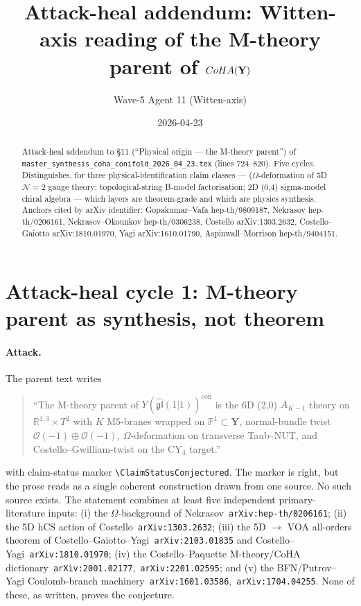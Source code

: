 \documentclass[11pt]{amsart}
\title{Attack-heal addendum: Witten-axis reading of the M-theory parent of
  $\CoHA(\bY)$}
\author{Wave-5 Agent 11 (Witten-axis)}
\date{2026-04-23}
\theoremstyle{definition}
\providecommand{\bY}{\mathbf{Y}}
\providecommand{\cO}{\mathcal{O}}
\providecommand{\bR}{\mathbb{R}}
\providecommand{\bP}{\mathbb{P}}
\providecommand{\fgl}{\mathfrak{gl}}
\providecommand{\cN}{\mathcal{N}}
\begin{document}
\maketitle

\begin{abstract}
\noindent Attack-heal addendum to \S11 (``Physical origin --- the
M-theory parent'') of
\texttt{master\_synthesis\_coha\_conifold\_2026\_04\_23.tex}
(lines 724--820). Five cycles. Distinguishes, for three
physical-identification claim classes --- ($\Omega$-deformation of
5D $\cN=2$ gauge theory; topological-string B-model factorisation;
2D (0,4) sigma-model chiral algebra --- which layers are theorem-grade
and which are physics synthesis. Anchors cited by arXiv identifier:
Gopakumar--Vafa hep-th/9809187, Nekrasov hep-th/0206161,
Nekrasov--Okounkov hep-th/0306238, Costello arXiv:1303.2632,
Costello--Gaiotto arXiv:1810.01970, Yagi arXiv:1610.01790,
Aspinwall--Morrison hep-th/9404151.
\end{abstract}

\tableofcontents

\section{Attack-heal cycle 1: M-theory parent as synthesis, not theorem}

\paragraph*{Attack.}
The parent text writes
\begin{quote}
  ``The M-theory parent of $Y(\widehat{\fgl}(1|1))^{\mathrm{con}}$ is
  the 6D (2,0) $A_{K-1}$ theory on $\bR^{1,3} \times T^2$ with $K$
  M5-branes wrapped on $\bP^1 \subset \bY$, normal-bundle twist
  $\cO(-1) \oplus \cO(-1)$, $\Omega$-deformation on transverse
  Taub--NUT, and Costello--Gwilliam-twist on the CY$_3$ target.''
\end{quote}
with claim-status marker
\texttt{\textbackslash ClaimStatusConjectured}. The marker is right,
but the prose reads as a single coherent construction drawn from one
source. No such source exists. The statement combines at least five
independent primary-literature inputs: (i) the $\Omega$-background of
Nekrasov~\texttt{arXiv:hep-th/0206161}; (ii) the 5D hCS action of
Costello~\texttt{arXiv:1303.2632}; (iii) the 5D $\to$ VOA
all-orders theorem of Costello--Gaiotto--Yagi~\texttt{arXiv:2103.01835}
and Costello--Yagi~\texttt{arXiv:1810.01970}; (iv) the
Costello--Paquette M-theory/CoHA
dictionary~\texttt{arXiv:2001.02177},~\texttt{arXiv:2201.02595}; and
(v) the BFN/Putrov--Yagi Coulomb-branch
machinery~\texttt{arXiv:1601.03586},~\texttt{arXiv:1704.04255}. None
of these, as written, proves the conjecture.
\end{document}
